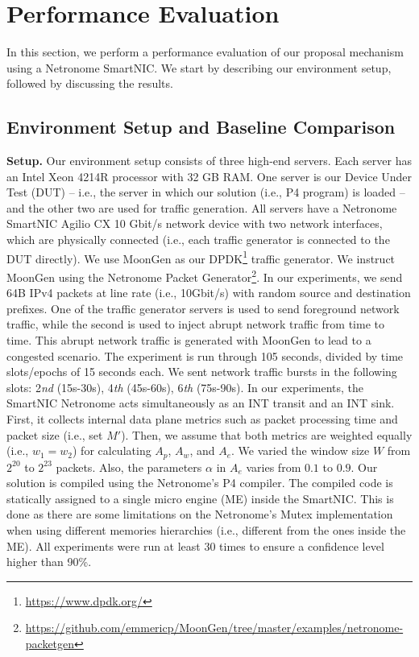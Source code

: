 \section{Performance Evaluation}

In this section, we perform a performance evaluation of our proposal mechanism using a Netronome SmartNIC. We start by describing our environment setup, followed by discussing the results.

\subsection{Environment Setup and Baseline Comparison}

\noindent\textbf{Setup.} Our environment setup consists of three high-end servers. Each server has an Intel Xeon 4214R processor with 32 GB RAM. One server is our Device Under Test (DUT) -- i.e., the server in which our solution (i.e., P4 program) is loaded -- and the other two are used for traffic generation. All servers have a Netronome SmartNIC Agilio CX 10 Gbit/s network device with two network interfaces, which are physically connected (i.e., each traffic generator is connected to the DUT directly). 
%
We use MoonGen\cite{moongen} as our DPDK\footnote{\url{https://www.dpdk.org/}} traffic generator. We instruct MoonGen using the Netronome Packet Generator\footnote{\url{https://github.com/emmericp/MoonGen/tree/master/examples/netronome-packetgen}}. In our experiments, we send 64B IPv4 packets at line rate (i.e., 10Gbit/s) with random source and destination prefixes. One of the traffic generator servers is used to send foreground network traffic, while the second is used to inject abrupt network traffic from time to time. This abrupt network traffic is generated with MoonGen to lead to a congested scenario. The experiment is run through 105 seconds, divided by time slots/epochs of 15 seconds each. We sent network traffic bursts in the following slots: 2\textit{nd} (15s-30s), 4\textit{th} (45s-60s), 6\textit{th} (75s-90s). In our experiments, the SmartNIC Netronome acts simultaneously as an INT transit and an INT sink. First, it collects internal data plane metrics such as packet processing time and packet size (i.e., set $M'$). Then, we assume that both metrics are weighted equally (i.e., $w_1 = w_2$) for calculating $A_p$, $A_w$, and $A_e$. We varied the window size $W$ from $2^{20}$ to $2^{23}$ packets. Also, the parameters $\alpha$ in $A_e$ varies from $0.1$ to $0.9$. Our solution is compiled using the Netronome's P4 compiler. The compiled code is statically assigned to a single micro engine (ME) inside the SmartNIC. This is done as there are some limitations on the Netronome's Mutex implementation when using different memories hierarchies (i.e., different from the ones inside the ME). All experiments were run at least 30 times to ensure a confidence level higher than 90\%. \\

